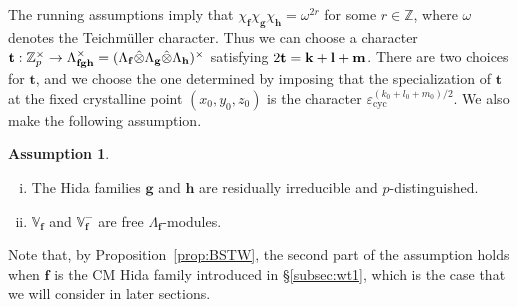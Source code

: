 \documentclass[a4paper,11pt]{amsart}
\theoremstyle{plain}
\theoremstyle{definition}
\newtheorem{ass}[theorem]{Assumption}
\theoremstyle{remark}
\newcommand{\bb}{\mathbb}
\DeclareMathOperator{\cyc}{cyc}
\newcommand{\Lp}{{\mathscr{L}_p}}
\newcommand{\hf}{{\mathbf{f}}}
\newcommand{\hg}{{\mathbf{g}}}
\newcommand{\hh}{{\mathbf h}}
\numberwithin{equation}{section}
\begin{document}
The running assumptions imply that $\chi_{\hf} \chi_{\hg} \chi_{\hh} = \omega^{2r}$ for some $r\in \mathbb{Z}$, where $\omega$ denotes the Teichm\"uller character. Thus we can choose a character ${\bf t}: \mathbb Z_p^\times \to \Lambda_{\hf\hg\hh}^\times=(\Lambda_\hf \hat{\otimes} \Lambda_\hg \hat{\otimes}\Lambda_\hh)^\times$ satisfying $2{\bf t} = {\bf k} + {\bf l} + {\bf m}$. There are two choices for $\mathbf{t}$, and we choose the one determined by imposing that the specialization of $\mathbf{t}$ at the fixed crystalline point $(x_0,y_0,z_0)$ is the character $\varepsilon_{\cyc}^{(k_0+l_0+m_0)/2}$. %
We also make the following assumption.

\begin{ass}
\hfill
    \begin{enumerate}[(i)]
        \item The Hida families $\hg$ and $\hh$ are residually irreducible and $p$-distinguished.
        \item $\bb{V}_{\hf}$ and $\bb{V}_{\hf}^-$ are free $\Lambda_\hf$-modules.
    \end{enumerate}
\end{ass}

Note that, by Proposition~\ref{prop:BSTW}, the second part of the assumption holds when $\hf$ is the CM Hida family introduced in \S\ref{subsec:wt1}, which is the case that we will consider in later sections.


\end{document}
